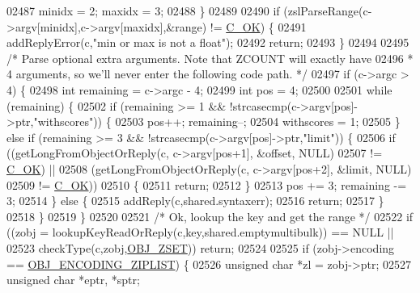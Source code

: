\begin{DoxyCode}
02487         minidx = 2; maxidx = 3;
02488     \}
02489 
02490     \textcolor{keywordflow}{if} (zslParseRange(c->argv[minidx],c->argv[maxidx],&range) != \hyperlink{server_8h_a303769ef1065076e68731584e758d3e1}{C\_OK}) \{
02491         addReplyError(c,\textcolor{stringliteral}{"min or max is not a float"});
02492         \textcolor{keywordflow}{return};
02493     \}
02494 
02495     \textcolor{comment}{/* Parse optional extra arguments. Note that ZCOUNT will exactly have}
02496 \textcolor{comment}{     * 4 arguments, so we'll never enter the following code path. */}
02497     \textcolor{keywordflow}{if} (c->argc > 4) \{
02498         \textcolor{keywordtype}{int} remaining = c->argc - 4;
02499         \textcolor{keywordtype}{int} pos = 4;
02500 
02501         \textcolor{keywordflow}{while} (remaining) \{
02502             \textcolor{keywordflow}{if} (remaining >= 1 && !strcasecmp(c->argv[pos]->ptr,\textcolor{stringliteral}{"withscores"})) \{
02503                 pos++; remaining--;
02504                 withscores = 1;
02505             \} \textcolor{keywordflow}{else} \textcolor{keywordflow}{if} (remaining >= 3 && !strcasecmp(c->argv[pos]->ptr,\textcolor{stringliteral}{"limit"})) \{
02506                 \textcolor{keywordflow}{if} ((getLongFromObjectOrReply(c, c->argv[pos+1], &offset, NULL)
02507                         != \hyperlink{server_8h_a303769ef1065076e68731584e758d3e1}{C\_OK}) ||
02508                     (getLongFromObjectOrReply(c, c->argv[pos+2], &limit, NULL)
02509                         != \hyperlink{server_8h_a303769ef1065076e68731584e758d3e1}{C\_OK}))
02510                 \{
02511                     \textcolor{keywordflow}{return};
02512                 \}
02513                 pos += 3; remaining -= 3;
02514             \} \textcolor{keywordflow}{else} \{
02515                 addReply(c,shared.syntaxerr);
02516                 \textcolor{keywordflow}{return};
02517             \}
02518         \}
02519     \}
02520 
02521     \textcolor{comment}{/* Ok, lookup the key and get the range */}
02522     \textcolor{keywordflow}{if} ((zobj = lookupKeyReadOrReply(c,key,shared.emptymultibulk)) == NULL ||
02523         checkType(c,zobj,\hyperlink{server_8h_a8c356422ddbc03bd77694880a30a1953}{OBJ\_ZSET})) \textcolor{keywordflow}{return};
02524 
02525     \textcolor{keywordflow}{if} (zobj->encoding == \hyperlink{server_8h_aabf064ede983103f1fd0df2086e84eee}{OBJ\_ENCODING\_ZIPLIST}) \{
02526         \textcolor{keywordtype}{unsigned} \textcolor{keywordtype}{char} *zl = zobj->ptr;
02527         \textcolor{keywordtype}{unsigned} \textcolor{keywordtype}{char} *eptr, *sptr;

\end{DoxyCode}
